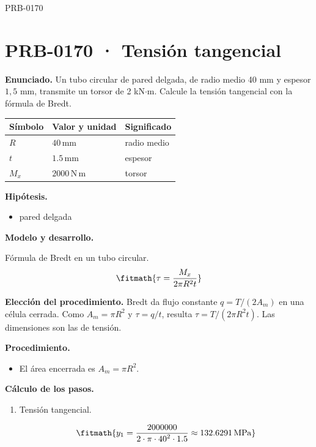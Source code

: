 \begin{studiumworked}{PRB-0170}

\section{PRB-0170 · Tensión tangencial}

\textbf{Enunciado.} Un tubo circular de pared delgada, de radio medio 40 mm y espesor $1{,}5$ mm, transmite un torsor de 2 kN$\cdot$m. Calcule la tensión tangencial con la fórmula de Bredt.

\par\medskip\noindent\begin{tabular}{@{}p{.18\linewidth}p{.26\linewidth}p{.48\linewidth}@{}}
\toprule Símbolo & Valor y unidad & Significado\\\midrule
$R$ & $40\,\mathrm{mm}$ & radio medio\\
$t$ & $1.5\,\mathrm{mm}$ & espesor\\
$M_{x}$ & $2000\,\mathrm{N\,m}$ & torsor\\
\bottomrule\end{tabular}\par\medskip

\textbf{Hipótesis.}\begin{itemize}\item pared delgada\end{itemize}

\textbf{Modelo y desarrollo.}

Fórmula de Bredt en un tubo circular.\[\fitmath{\tau = \frac{M_x}{2\pi R^{2} t}}\]

\textbf{Elección del procedimiento.} Bredt da flujo constante $q=T/(2A_m)$ en una célula cerrada. Como $A_m=\pi R^2$ y $\tau=q/t$, resulta $\tau=T/(2\pi R^2t)$. Las dimensiones son las de tensión.

\textbf{Procedimiento.}\begin{itemize}\item El área encerrada es $A_m = \pi R^2$.\end{itemize}

\textbf{Cálculo de los pasos.}

\begin{enumerate}

\item Tensión tangencial.

\[\fitmath{y_{1}=\frac{2000000}{2\cdot \pi\cdot {40}^{2}\cdot 1.5}\approx 132.6291\,\mathrm{MPa}}\]

\end{enumerate}


\end{studiumworked}
